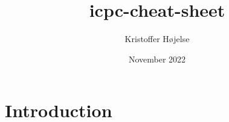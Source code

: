 \documentclass{article}
\title{icpc-cheat-sheet}
\author{Kristoffer Højelse}
\date{November 2022}
\begin{document}
\maketitle

\section{Introduction}
\end{document}
